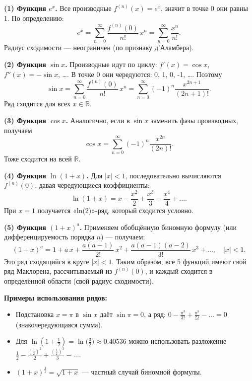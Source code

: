 \begin{customproof}
	\textbf{(1) Функция $e^x$.}
	Все производные $f^{(n)}(x)=e^x$, значит в точке 0 они равны 1. По определению:
	\[
		e^x
		= \sum_{n=0}^\infty \frac{f^{(n)}(0)}{n!}\,x^n
		= \sum_{n=0}^\infty \frac{x^n}{n!}.
	\]
	Радиус сходимости --- неограничен (по признаку д'Аламбера).

	\smallskip

	\textbf{(2) Функция $\sin x$.}
	Производные идут по циклу: $f'(x)=\cos x$, $f''(x)=-\sin x$, \dots .
	В точке 0 они чередуются: 0, 1, 0, -1, \dots . Поэтому
	\[
		\sin x
		= \sum_{n=0}^\infty \frac{f^{(n)}(0)}{n!}\,x^n
		= \sum_{n=0}^\infty (-1)^n \frac{x^{2n+1}}{(2n+1)!}.
	\]
	Ряд сходится для всех $x\in\mathbb{R}$.

	\smallskip

	\textbf{(3) Функция $\cos x$.}
	Аналогично, если в $\sin x$ заменить фазы производных, получаем
	\[
		\cos x
		= \sum_{n=0}^\infty (-1)^n \frac{x^{2n}}{(2n)!}.
	\]
	Тоже сходится на всей $\mathbb{R}$.

	\smallskip

	\textbf{(4) Функция $\ln(1+x)$.}
	Для $|x|<1$, последовательно вычисляются $f^{(n)}(0)$, давая чередующиеся коэффициенты:
	\[
		\ln(1+x)
		= x - \frac{x^2}{2} + \frac{x^3}{3} - \frac{x^4}{4} + \dots .
	\]
	При $x=1$ получается «ln(2)»-ряд, который сходится условно.

	\smallskip

	\textbf{(5) Функция $(1+x)^a$.}
	Применяем обобщённую биномную формулу (или дифференцируемость порядка $n$) ---
	получаем:
	\[
		(1+x)^a
		= 1 + a\,x + \frac{a(a-1)}{2!}\,x^2
		+ \frac{a(a-1)(a-2)}{3!}\,x^3 + \dots ,
		\quad |x|<1.
	\]
	Это ряд сходящийся в круге $|x|<1$.
	Таким образом, все 5 функций имеют свой ряд Маклорена, рассчитываемый
	из $f^{(n)}(0)$, и каждый сходится в определённой области (свой радиус сходимости).
\end{customproof}

\begin{customexample}
	\textbf{Примеры использования рядов:}
	\begin{itemize}
		\item Подстановка $x=\pi$ в \(\sin x\) даёт \(\sin\pi=0\), а ряд:
		      \(0 - \frac{\pi^3}{3!} + \frac{\pi^5}{5!} - \dots = 0\) (знакочередующаяся сумма).
		\item Для \(\ln(1+\tfrac12) = \ln\!\bigl(\tfrac32\bigr)\approx 0.40536\) можно использовать
		      разложение \( \tfrac12 - \tfrac{(\tfrac12)^2}{2} + \tfrac{(\tfrac12)^3}{3} - \dots \).
		\item \((1+x)^{\tfrac12} = \sqrt{1+x}\) --- частный случай биномной формулы.
	\end{itemize}
\end{customexample}
